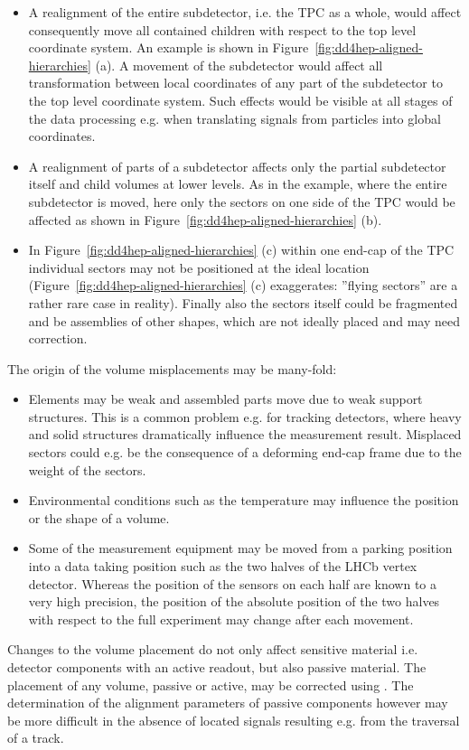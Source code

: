 \documentclass[10pt,a4paper]{article}
\begin{document}
\noindent
\begin{itemize}\itemcompact
\item A realignment of the entire subdetector, i.e. the TPC as a whole, 
    would affect consequently move all contained children with respect to the 
    top level coordinate system. An example is shown in 
    Figure~\ref{fig:dd4hep-aligned-hierarchies} (a). A movement of the subdetector
    would affect all transformation between local coordinates of any part of the
    subdetector to the top level coordinate system. Such effects would be visible 
    at all stages of the data processing e.g. when translating signals from 
    particles into global coordinates.
\item A realignment of parts of a subdetector affects only the partial subdetector
    itself and child volumes at lower levels. As in the example, where the entire
    subdetector is moved, here only the sectors on one 
    side of the TPC would be affected
    as shown in Figure~\ref{fig:dd4hep-aligned-hierarchies} (b).
\item In Figure~\ref{fig:dd4hep-aligned-hierarchies} (c) within one 
    end-cap of the TPC
    individual sectors may not be positioned at the ideal location
    (Figure~\ref{fig:dd4hep-aligned-hierarchies} (c) exaggerates: 
    ''flying sectors'' are a rather rare case in reality).
    Finally also the sectors itself could be fragmented and be assemblies of other
    shapes, which are not ideally placed and may need correction.
\end{itemize}
The origin of the volume misplacements may be many-fold:
\begin{itemize}\itemcompact
\item Elements may be weak and assembled parts move due to weak support
    structures.
    This is a common problem e.g. for tracking detectors, where heavy and solid 
    structures dramatically influence the measurement result.
    Misplaced sectors could e.g. be the consequence of a deforming 
    end-cap frame due to the weight of the sectors.
\item Environmental conditions such as the temperature may influence the 
    position or the shape of a volume.
\item Some of the measurement equipment may be moved from a parking position into 
    a data taking position such as the two halves of the LHCb vertex detector. 
    Whereas the position of the sensors on each half are known to a very high 
    precision, the position of the absolute position of the two halves with
    respect to the full experiment may change after each movement.
\end{itemize}
Changes to the volume placement do not only affect sensitive material 
i.e. detector components with an active readout, but also passive material. 
The placement of any volume, passive or active, may be corrected using \DDA. 
The determination of the alignment parameters of passive components however may
be more difficult in the absence of located signals resulting 
e.g. from the traversal of a track.
\end{document}
